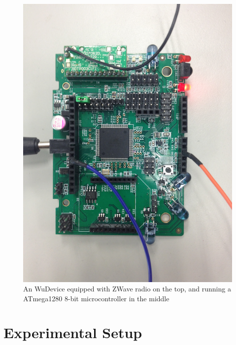 \begin{figure}[h!]
\centering
    \includegraphics[width=\linewidth]{figures/wudevice}
\caption{An WuDevice equipped with ZWave radio on the top, and running
  a ATmega1280 8-bit microcontroller in the middle}
\label{fig:wudevice}
\end{figure}

\section{Experimental Setup}


